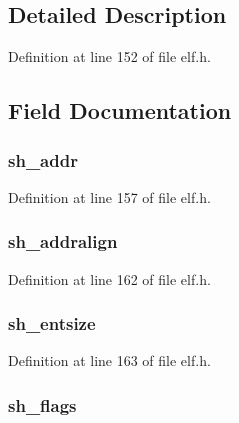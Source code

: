 \subsection{Detailed Description}


Definition at line 152 of file elf.\-h.



\subsection{Field Documentation}
\hypertarget{struct_elf32___shdr_a18c60e7404cee4ccf1e7a77445764bc4}{
\subsubsection[{sh\-\_\-addr}]{ sh\-\_\-addr}}\label{struct_elf32___shdr_a18c60e7404cee4ccf1e7a77445764bc4}


Definition at line 157 of file elf.\-h.

\hypertarget{struct_elf32___shdr_a63c4e1b5e5601867073efc0ee9d9ede4}{
\subsubsection[{sh\-\_\-addralign}]{ sh\-\_\-addralign}}\label{struct_elf32___shdr_a63c4e1b5e5601867073efc0ee9d9ede4}


Definition at line 162 of file elf.\-h.

\hypertarget{struct_elf32___shdr_ab8925d294ee527ad4d9a5f573cbfb3f8}{
\subsubsection[{sh\-\_\-entsize}]{ sh\-\_\-entsize}}\label{struct_elf32___shdr_ab8925d294ee527ad4d9a5f573cbfb3f8}


Definition at line 163 of file elf.\-h.

\hypertarget{struct_elf32___shdr_a23c0c41226f447a73c37d501692e75d7}{
\subsubsection[{sh\-\_\-flags}]{ sh\-\_\-flags}}\label{struct_elf32___shdr_a23c0c41226f447a73c37d501692e75d7}


